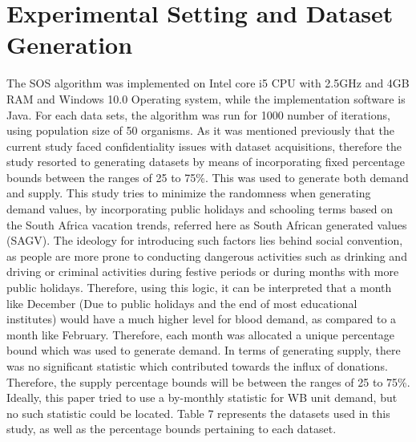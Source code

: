 \documentclass{article}
\begin{document}
\section{Experimental Setting and Dataset Generation}
The SOS algorithm was implemented on Intel core i5 CPU with 2.5GHz and 4GB RAM and Windows 10.0 Operating system, while the implementation software is Java. For each data sets, the algorithm was run for 1000 number of iterations, using population size of 50 organisms. As it was mentioned previously that the current study faced confidentiality issues with dataset acquisitions, therefore the study resorted to generating datasets by means of incorporating fixed percentage bounds between the ranges of 25 to 75\%. This was used to generate both demand and supply. This study tries to minimize the randomness when generating demand values, by incorporating public holidays and schooling terms based on the South Africa vacation trends, referred here as South African generated values (SAGV). The ideology for introducing such factors lies behind social convention, as people are more prone to conducting dangerous activities such as drinking and driving or criminal activities during festive periods or during months with more public holidays. Therefore, using this logic, it can be interpreted that a month like December (Due to public holidays and the end of most educational institutes) would have a much higher level for blood demand, as compared to a month like February. Therefore, each month was allocated a unique percentage bound which was used to generate demand. In terms of generating supply, there was no significant statistic which contributed towards the influx of donations. Therefore, the supply percentage bounds will be between the ranges of 25 to 75\%. Ideally, this paper tried to use a by-monthly statistic for WB unit demand, but no such statistic could be located. Table 7 represents the datasets used in this study, as well as the percentage bounds pertaining to each dataset.
\end{document}

